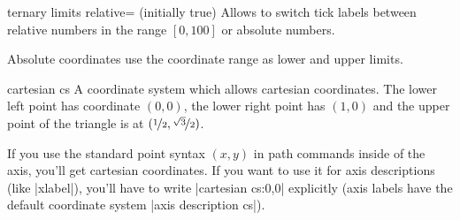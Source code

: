\begin{codeexample}[]
\end{codeexample}

\begin{pgfplotskey}{ternary limits relative= (initially true)}
	Allows to switch tick labels between relative numbers in the range $[0,100]$ or absolute numbers.
	
	Absolute coordinates use the coordinate range as lower and upper limits.
\end{pgfplotskey}

\begin{coordinatesystem}{cartesian cs}
	A coordinate system which allows cartesian coordinates. The lower left point has coordinate $(0,0)$, the lower right point has $(1,0)$ and the upper point of the triangle is at $(\nicefrac12, \nicefrac{\sqrt3}{2})$.

	If you use the standard point syntax $(x,y)$ in path commands inside of the axis, you'll get cartesian coordinates. If you want to use it for axis descriptions (like |xlabel|), you'll have to write |cartesian cs:0,0| explicitly (axis labels have the default coordinate system |axis description cs|).
\begin{codeexample}[]
\end{codeexample}
\end{coordinatesystem}

